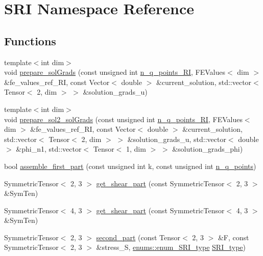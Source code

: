 \hypertarget{namespaceSRI}{}\section{S\+RI Namespace Reference}
\label{namespaceSRI}
\subsection*{Functions}
\begin{DoxyCompactItemize}
\item 
{\footnotesize template$<$int dim$>$ }\\void \hyperlink{namespaceSRI_add98d0fc70a6c51803dfd8c491547413}{prepare\+\_\+sol\+Grads} (const unsigned int \hyperlink{assembly__routine__SRI_8cc_a0b72b2a33d52b7597b87df35b5b92415}{n\+\_\+q\+\_\+points\+\_\+\+RI}, F\+E\+Values$<$ dim $>$ \&fe\+\_\+values\+\_\+ref\+\_\+\+RI, const Vector$<$ double $>$ \&current\+\_\+solution, std\+::vector$<$ Tensor$<$ 2, dim $>$ $>$ \&solution\+\_\+grads\+\_\+u)
\item 
{\footnotesize template$<$int dim$>$ }\\void \hyperlink{namespaceSRI_a369a3f624dbb7fdc2106bcc520366d24}{prepare\+\_\+sol2\+\_\+sol\+Grads} (const unsigned int \hyperlink{assembly__routine__SRI_8cc_a0b72b2a33d52b7597b87df35b5b92415}{n\+\_\+q\+\_\+points\+\_\+\+RI}, F\+E\+Values$<$ dim $>$ \&fe\+\_\+values\+\_\+ref\+\_\+\+RI, const Vector$<$ double $>$ \&current\+\_\+solution, std\+::vector$<$ Tensor$<$ 2, dim $>$ $>$ \&solution\+\_\+grads\+\_\+u, std\+::vector$<$ double $>$ \&phi\+\_\+n1, std\+::vector$<$ Tensor$<$ 1, dim $>$ $>$ \&solution\+\_\+grads\+\_\+phi)
\item 
bool \hyperlink{namespaceSRI_a8403675a876445cd7f069cc73aa55d05}{assemble\+\_\+first\+\_\+part} (const unsigned int k, const unsigned int \hyperlink{assembly__routine__SRI_8cc_afd52b693751274175b93a58458201e6b}{n\+\_\+q\+\_\+points})
\item 
Symmetric\+Tensor$<$ 2, 3 $>$ \hyperlink{namespaceSRI_aa4f8e16d0494b0945d0eadb845367ab4}{get\+\_\+shear\+\_\+part} (const Symmetric\+Tensor$<$ 2, 3 $>$ \&Sym\+Ten)
\item 
Symmetric\+Tensor$<$ 4, 3 $>$ \hyperlink{namespaceSRI_a41e9c32e257c2d3d3ae337cd992658ee}{get\+\_\+shear\+\_\+part} (const Symmetric\+Tensor$<$ 4, 3 $>$ \&Sym\+Ten)
\item 
Symmetric\+Tensor$<$ 2, 3 $>$ \hyperlink{namespaceSRI_a6fddaa4232b80942ecf98d0d5bb69d83}{second\+\_\+part} (const Tensor$<$ 2, 3 $>$ \&F, const Symmetric\+Tensor$<$ 2, 3 $>$ \&stress\+\_\+S, \hyperlink{namespaceenums_ad159a7d6539f111883db3b07c09601a8}{enums\+::enum\+\_\+\+S\+R\+I\+\_\+type} \hyperlink{assembly__routine__SRI_8cc_a163566963ded80f68a5bbc6d04ce0adf}{S\+R\+I\+\_\+type})

\end{DoxyCompactItemize}
